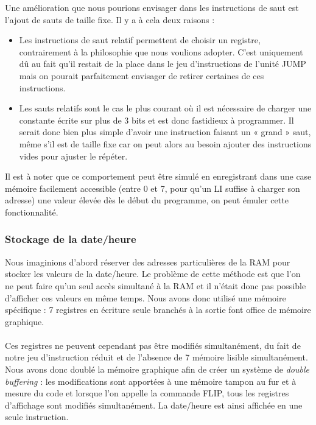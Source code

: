 \documentclass{article}
\begin{document}
Une amélioration que nous pourions envisager dans les instructions de saut est
l'ajout de sauts de taille fixe. Il y a à cela deux raisons :
\begin{itemize}
  \item Les instructions de saut relatif permettent de choisir un registre, contrairement
        à la philosophie que nous voulions adopter. C'est uniquement dû au fait qu'il
        restait de la place dans le jeu d'instructions de l'unité JUMP mais on pourait
        parfaitement envisager de retirer certaines de ces instructions.
  \item Les sauts relatifs sont le cas le plus courant où il est nécessaire de charger
        une constante écrite sur plus de 3 bits et est donc fastidieux à programmer.
        Il serait donc bien plus simple d'avoir une instruction faisant un « grand »
        saut, même s'il est de taille fixe car on peut alors au besoin ajouter des
        instructions vides pour ajuster le répéter.
\end{itemize}

Il est à noter que ce comportement peut être simulé en enregistrant dans une case
mémoire facilement accessible (entre 0 et 7, pour qu'un LI suffise à charger son
adresse) une valeur élevée dès le début du programme, on peut émuler cette fonctionnalité.

\subsubsection{Stockage de la date/heure}
Nous imaginions d'abord réserver des adresses particulières de la RAM pour
stocker les valeurs de la date/heure. Le problème de cette méthode est que l'on
ne peut faire qu'un seul accès simultané à la RAM et il n'était donc pas possible
d'afficher ces valeurs en même temps. Nous avons donc utilisé une mémoire
spécifique : 7 registres en écriture seule branchés à la sortie font office
de mémoire graphique.

\paragraph{}
Ces registres ne peuvent cependant pas être modifiés simultanément, du fait de
notre jeu d'instruction réduit et de l'absence de 7 mémoire lisible simultanément.
Nous avons donc doublé la mémoire graphique afin de créer un système de \emph{double
buffering} : les modifications sont apportées à une mémoire tampon au fur et à mesure
du code et lorsque l'on appelle la commande FLIP, tous les registres d'affichage
sont modifiés simultanément. La date/heure est ainsi affichée en une seule instruction.
\end{document}

